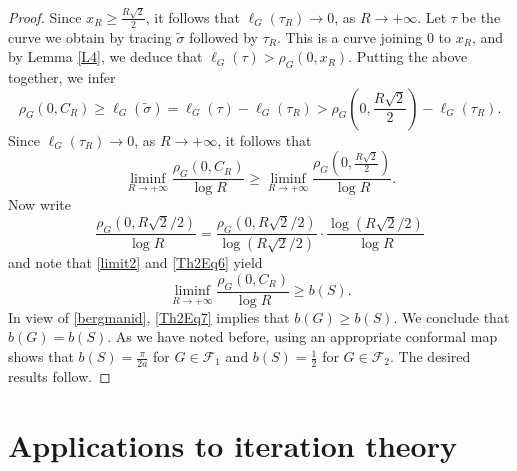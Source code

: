 \documentclass[11pt, letterpaper,leqno]{amsart}
\numberwithin{equation}{section}
\theoremstyle{definition}
\begin{document}
\begin{proof}
Since $x_R\geq \frac{R\sqrt{2}}{2}$, it follows that $\ell_G(\tau_R)\to 0$, as $R\to +\infty$. Let $\tau$ be the curve we obtain by tracing $\tilde{\sigma}$ followed by $\tau_R$. This is a curve joining $0$ to $x_R$, and by Lemma \ref{L4}, we deduce that $\ell_G(\tau)>\rho_G(0,x_R)$. Putting the above together, we infer
\[
\rho_G(0,C_R)\geq \ell_G(\tilde{\sigma})= \ell_G(\tau)-\ell_G(\tau_R)>\rho_G\left(0,\frac{R\sqrt{2}}{2}\right)-\ell_G(\tau_R).
\]
Since $\ell_G(\tau_R)\to 0$, as $R\to +\infty$, it follows that
\begin{equation}\label{Th2Eq6}
\liminf_{R\to +\infty}\frac{\rho_G(0,C_R)}{\log R}\geq \liminf_{R\to +\infty}\frac{\rho_G\left(0,\frac{R\sqrt{2}}{2}\right)}{\log R}.
\end{equation}
Now write 
\[
\frac{\rho_G\left(0,R\sqrt{2}/2\right)}{\log R}=\frac{\rho_G\left(0,R\sqrt{2}/2\right)}{\log (R\sqrt{2}/2)}\cdot\frac{\log (R\sqrt{2}/2)}{\log R}
\]
and note that \eqref{limit2} and \eqref{Th2Eq6} yield
\begin{equation}\label{Th2Eq7}
\liminf_{R\to +\infty}\frac{\rho_G(0,C_R)}{\log R}\geq b(S).
\end{equation}
In view of \eqref{bergmanid}, \eqref{Th2Eq7} implies that $b(G)\geq b(S)$. We conclude that $b(G)=b(S)$. As we have noted before, using an appropriate conformal map shows that $b(S)=\frac{\pi}{2a}$ for $G\in \mathcal{F}_1$ and $b(S)=\frac{1}{2}$ for $G\in\mathcal{F}_2$. The desired results follow.
\end{proof}




\section{Applications to iteration theory}
\end{document}
